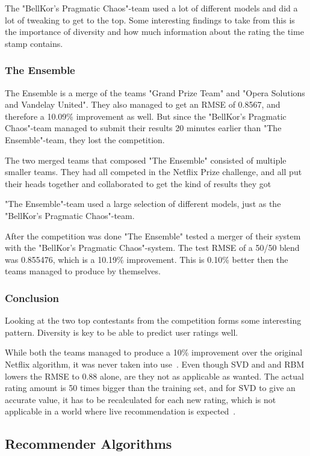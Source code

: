 The "BellKor's Pragmatic Chaos"-team used a lot of different models and did a lot of tweaking to get to the top. Some interesting findings to take from this is the importance of diversity and how much information about the rating the time stamp contains.

\subsubsection{The Ensemble}
The Ensemble is a merge of the teams "Grand Prize Team" and "Opera Solutions and Vandelay United". They also managed to get an RMSE of 0.8567, and therefore a 10.09\% improvement as well. But since the "BellKor's Pragmatic Chaos"-team managed to submit their results 20 minutes earlier than "The Ensemble"-team, they lost the competition.

The two merged teams that composed "The Ensemble" consisted of multiple smaller teams. They had all competed in the Netflix Prize challenge, and all put their heads together and collaborated to get the kind of results they got

"The Ensemble"-team used a large selection of different models, just as the "BellKor's Pragmatic Chaos"-team.

After the competition was done "The Ensemble" tested a merger of their system with the "BellKor's Pragmatic Chaos"-system. The test RMSE of a 50/50 blend was 0.855476, which is a 10.19\% improvement. This is 0.10\% better then the teams managed to produce by themselves.

\subsubsection{Conclusion}
Looking at the two top contestants from the competition forms some interesting pattern. Diversity is key to be able to predict user ratings well.

While both the teams managed to produce a 10\% improvement over the original Netflix algorithm, it was never taken into use~\cite{nfbeyond5}. Even though SVD and and RBM lowers the RMSE to 0.88 alone, are they not as applicable as wanted. The actual rating amount is 50 times bigger than the training set, and for SVD to give an accurate value, it has to be recalculated for each new rating, which is not applicable in a world where live recommendation is expected~\cite{nfbeyond5}.


\subsection{Recommender Algorithms}
